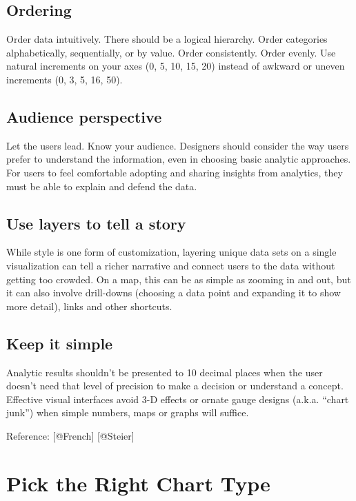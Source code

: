 \documentclass[]{book}
\theoremstyle{definition}
\theoremstyle{definition}
\theoremstyle{definition}
\theoremstyle{remark}
\begin{document}
\subsection{Ordering}\label{ordering}

Order data intuitively. There should be a logical hierarchy. Order
categories alphabetically, sequentially, or by value. Order
consistently. Order evenly. Use natural increments on your axes (0, 5,
10, 15, 20) instead of awkward or uneven increments (0, 3, 5, 16, 50).

\subsection{Audience perspective}\label{audience-perspective}

Let the users lead. Know your audience. Designers should consider the
way users prefer to understand the information, even in choosing basic
analytic approaches. For users to feel comfortable adopting and sharing
insights from analytics, they must be able to explain and defend the
data.

\subsection{Use layers to tell a
story}\label{use-layers-to-tell-a-story}

While style is one form of customization, layering unique data sets on a
single visualization can tell a richer narrative and connect users to
the data without getting too crowded. On a map, this can be as simple as
zooming in and out, but it can also involve drill-downs (choosing a data
point and expanding it to show more detail), links and other shortcuts.

\subsection{Keep it simple}\label{keep-it-simple}

Analytic results shouldn't be presented to 10 decimal places when the
user doesn't need that level of precision to make a decision or
understand a concept. Effective visual interfaces avoid 3-D effects or
ornate gauge designs (a.k.a. ``chart junk'') when simple numbers, maps
or graphs will suffice.

Reference: {[}@French{]} {[}@Steier{]}

\section{Pick the Right Chart Type}\label{pick-the-right-chart-type}
\end{document}
